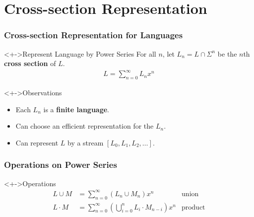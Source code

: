 \documentclass[pdftex,aspectratio=169]{beamer}
\begin{document}
\section{Cross-section Representation}


\begin{frame}
  \frametitle{Cross-section Representation for Languages}
  \vspace{-\baselineskip}
  \begin{block}<+->{Represent Language by Power Series}
    For all $n$, let
    $L_n = L \cap \Sigma^n$ be the $n$th \textbf{cross section} of $L$.
    \begin{gather*}
      L = \sum_{n=0}^\infty L_nx^n
    \end{gather*}
  \end{block}
  \begin{block}<+->{Observations}
    \begin{itemize}
    \item Each $L_n$ is a \textbf{finite language}.
    \item Can choose an efficient representation for the $L_n$.
    \item Can represent $L$ by a stream $[L_0, L_1, L_2, \dots ]$.
    \end{itemize}
  \end{block}
\end{frame}
\begin{frame}
  \frametitle{Operations on Power Series}
\begin{block}<+->{Operations}
  \vspace{-\baselineskip}
    \begin{align*}
      L \cup M & = \sum_{n=0}^\infty (L_n \cup M_n)x^n & \text{union}\\
      L \cdot M &= \sum_{n=0}^\infty (\bigcup_{i=0}^n L_i \cdot M_{n-i})x^n & \text{product}
    \end{align*}
  \end{block}
\end{frame}
\end{document}
